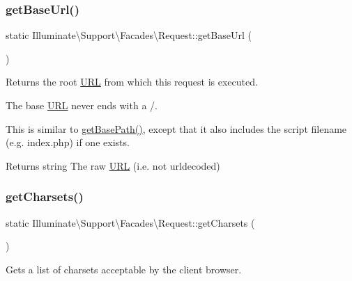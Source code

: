 \subsubsection{\texorpdfstring{get\+Base\+Url()}{getBaseUrl()}}
{\footnotesize\ttfamily static Illuminate\textbackslash{}\+Support\textbackslash{}\+Facades\textbackslash{}\+Request\+::get\+Base\+Url (\begin{DoxyParamCaption}{ }\end{DoxyParamCaption})\hspace{0.3cm}{\ttfamily [static]}}

Returns the root \mbox{\hyperlink{class_illuminate_1_1_support_1_1_facades_1_1_u_r_l}{U\+RL}} from which this request is executed.

The base \mbox{\hyperlink{class_illuminate_1_1_support_1_1_facades_1_1_u_r_l}{U\+RL}} never ends with a /.

This is similar to \mbox{\hyperlink{class_illuminate_1_1_support_1_1_facades_1_1_request_a7ff313f9f7aa4c84a15e5f5378ea0b6f}{get\+Base\+Path()}}, except that it also includes the script filename (e.\+g. index.\+php) if one exists.

\begin{DoxyReturn}{Returns}
string The raw \mbox{\hyperlink{class_illuminate_1_1_support_1_1_facades_1_1_u_r_l}{U\+RL}} (i.\+e. not urldecoded) 
\end{DoxyReturn}
\mbox{\label{class_illuminate_1_1_support_1_1_facades_1_1_request_a5a4578c833d85fc7e52e25c9f274f424}} 
\subsubsection{\texorpdfstring{get\+Charsets()}{getCharsets()}}
{\footnotesize\ttfamily static Illuminate\textbackslash{}\+Support\textbackslash{}\+Facades\textbackslash{}\+Request\+::get\+Charsets (\begin{DoxyParamCaption}{ }\end{DoxyParamCaption})\hspace{0.3cm}{\ttfamily [static]}}

Gets a list of charsets acceptable by the client browser.

